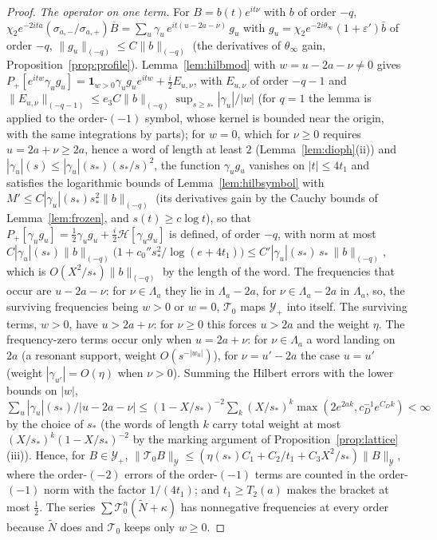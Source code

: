 \documentclass[11pt]{article}
\theoremstyle{definition}
\theoremstyle{remark}
\begin{document}
\begin{proof}
\emph{The operator on one term.} For $B=b(t)e^{it\nu}$ with $b$ of order $-q$, $\chi_2e^{-2ita}(\sigma_{a,-}/\sigma_{a,+})\overline B=\sum_u\gamma_u\,e^{it(u-2a-\nu)}\,g_u$ with $g_u=\chi_2e^{-2i\theta_\infty}(1+\varepsilon')\bar b$ of order $-q$, $\|g_u\|_{(-q)}\le C\|b\|_{(-q)}$ (the derivatives of $\theta_\infty$ gain, Proposition~\ref{prop:profile}). Lemma~\ref{lem:hilbmod} with $w=u-2a-\nu\ne0$ gives $P_+[e^{itw}\gamma_ug_u]=\mathbf 1_{w>0}\gamma_ug_ue^{itw}+\tfrac i2E_{u,\nu}$, with $E_{u,\nu}$ of order $-q-1$ and $\|E_{u,\nu}\|_{(-q-1)}\le e_3C\|b\|_{(-q)}\sup_{s\ge s_*}|\gamma_u|/|w|$ (for $q=1$ the lemma is applied to the order-$(-1)$ symbol, whose kernel is bounded near the origin, with the same integrations by parts); for $w=0$, which for $\nu\ge0$ requires $u=2a+\nu\ge2a$, hence a word of length at least $2$ (Lemma~\ref{lem:dioph}(ii)) and $|\gamma_u|(s)\le|\gamma_u|(s_*)(s_*/s)^2$, the function $\gamma_ug_u$ vanishes on $|t|\le4t_1$ and satisfies the logarithmic bounds of Lemma~\ref{lem:hilbsymbol} with $M'\le C|\gamma_u|(s_*)s_*^2\|b\|_{(-q)}$ (its derivatives gain by the Cauchy bounds of Lemma~\ref{lem:frozen}, and $s(t)\ge c\log t$), so that $P_+[\gamma_ug_u]=\tfrac12\gamma_ug_u+\tfrac i2\mathcal H[\gamma_ug_u]$ is defined, of order $-q$, with norm at most $C|\gamma_u|(s_*)\|b\|_{(-q)}\big(1+c_0''s_*^2/\log(e+4t_1)\big)\le C'|\gamma_u|(s_*)\,s_*\,\|b\|_{(-q)}$, which is $O(X^2/s_*)\|b\|_{(-q)}$ by the length of the word. The frequencies that occur are $u-2a-\nu$: for $\nu\in\Lambda_a$ they lie in $\Lambda_a-2a$, for $\nu\in\Lambda_a-2a$ in $\Lambda_a$, so, the surviving frequencies being $w>0$ or $w=0$, $\mathcal T_0$ maps $\mathcal Y_+$ into itself. The surviving terms, $w>0$, have $u>2a+\nu$: for $\nu\ge0$ this forces $u>2a$ and the weight $\eta$. The frequency-zero terms occur only when $u=2a+\nu$: for $\nu\in\Lambda_a$ a word landing on $2a$ (a resonant support, weight $O(s^{-|w_0|})$), for $\nu=u'-2a$ the case $u=u'$ (weight $|\gamma_{u'}|=O(\eta)$ when $\nu>0$). Summing the Hilbert errors with the lower bounds on $|w|$, $\sum_u|\gamma_u|(s_*)/|u-2a-\nu|\le(1-X/s_*)^{-2}\sum_k(X/s_*)^k\max(2e^{2ak},c_D^{-1}e^{C_Dk})<\infty$ by the choice of $s_*$ (the words of length $k$ carry total weight at most $(X/s_*)^k(1-X/s_*)^{-2}$ by the marking argument of Proposition~\ref{prop:lattice}(iii)). Hence, for $B\in\mathcal Y_+$, $\|\mathcal T_0B\|_{\mathcal Y}\le(\eta(s_*)C_1+C_2/t_1+C_3X^2/s_*)\|B\|_{\mathcal Y}$, where the order-$(-2)$ errors of the order-$(-1)$ terms are counted in the order-$(-1)$ norm with the factor $1/(4t_1)$; and $t_1\ge T_2(a)$ makes the bracket at most $\tfrac12$. The series $\sum\mathcal T_0^n(\tilde N+\kappa)$ has nonnegative frequencies at every order because $\tilde N$ does and $\mathcal T_0$ keeps only $w\ge0$.


\end{proof}
\end{document}
